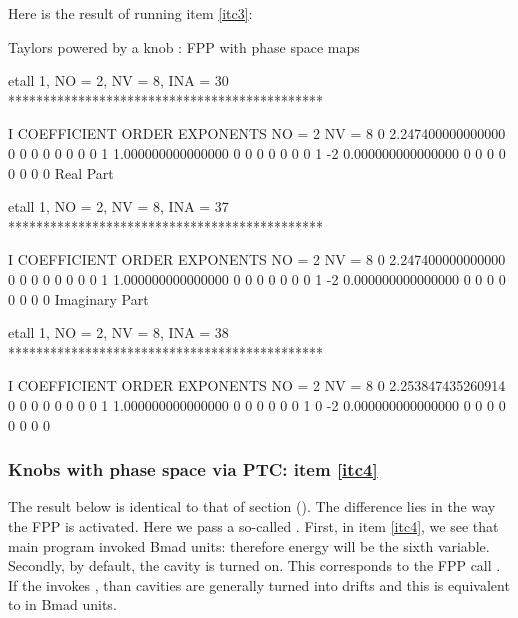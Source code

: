 \documentclass{hitec}     %
\begin{document}
{{{{{Here is the result of running item \ref{itc3}:

\renewcommand{\codefont}{\footnotesize}
\begin{code}
 Taylors powered by a knob : FPP with phase space maps

 etall    1, NO =    2, NV =    8, INA =   30
 *********************************************

    I  COEFFICIENT          ORDER   EXPONENTS
      NO =     2      NV =     8
   0   2.247400000000000       0  0  0  0  0  0  0  0
   1   1.000000000000000       0  0  0  0  0  0  0  1
    -2   0.000000000000000       0  0  0  0  0  0  0  0
  Real Part

 etall    1, NO =    2, NV =    8, INA =   37
 *********************************************

    I  COEFFICIENT          ORDER   EXPONENTS
      NO =     2      NV =     8
   0   2.247400000000000       0  0  0  0  0  0  0  0
   1   1.000000000000000       0  0  0  0  0  0  0  1
    -2   0.000000000000000       0  0  0  0  0  0  0  0
  Imaginary Part

 etall    1, NO =    2, NV =    8, INA =   38
 *********************************************

    I  COEFFICIENT          ORDER   EXPONENTS
      NO =     2      NV =     8
   0   2.253847435260914       0  0  0  0  0  0  0  0
   1   1.000000000000000       0  0  0  0  0  0  1  0
    -2   0.000000000000000       0  0  0  0  0  0  0  0
\end{code}
\renewcommand{\codefont}{\small}

 
\subsubsection{Knobs with phase space via PTC: item \ref{itc4}}
\label{s:initwithpsptc}

The result below is identical to that of section (). The difference lies in the way the FPP is activated. Here we pass a so-called .
First, in item \ref{itc4}, we see that main program invoked Bmad units: therefore energy will be the sixth variable. Secondly, by default, the cavity is turned on. This corresponds to the FPP call . If the  invokes , than cavities are generally turned into drifts and this is equivalent to  in Bmad units.

}}}}}
\end{document}
